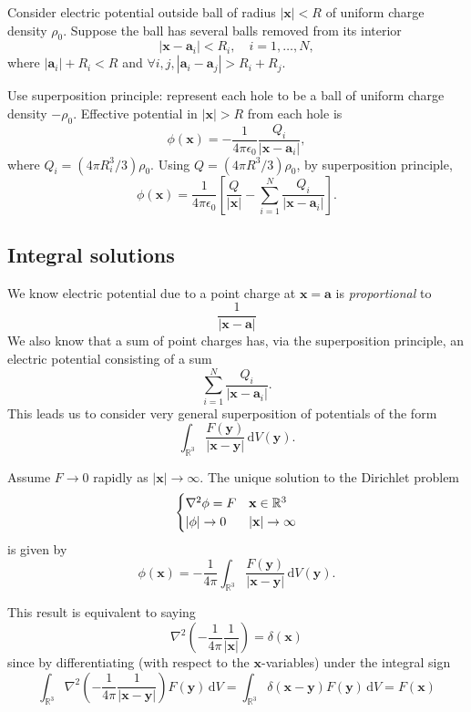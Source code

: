 \begin{example}
    Consider electric potential outside ball of radius $ |\mathbf{x}|<R $ of uniform charge density $ \rho_0 $. Suppose the ball has several balls removed from its interior
    \[
        |\mathbf{x}-\mathbf{a}_i|<R_i,\quad i=1,\dots,N,
    \]
    where $ |\mathbf{a}_i|+R_i<R $ and $ \forall i,j, |\mathbf{a}_i-\mathbf{a}_j|>R_i+R_j $.

    Use superposition principle: represent each hole to be a ball of uniform charge density $ -\rho_0 $. Effective potential in $ |\mathbf{x}|>R $ from each hole is 
    \[
        \phi(\mathbf{x}) = -\frac{1}{4\pi \epsilon_0}\frac{Q_i}{|\mathbf{x}-\mathbf{a}_i|},
    \]
    where $Q_{i}=\left(4 \pi R_{i}^{3} / 3\right) \rho_{0}$. Using $ Q=\left(4 \pi R^{3} / 3\right) \rho_{0} $, by superposition principle, 
    \[
        \phi(\mathbf{x})=\frac{1}{4 \pi \epsilon_{0}}\left[\frac{Q}{|\mathbf{x}|}-\sum_{i=1}^{N} \frac{Q_{i}}{\left|\mathbf{x}-\mathbf{a}_{i}\right|}\right].
    \]
\end{example}

\subsection{Integral solutions}
We know electric potential due to a point charge at $ \mathbf{x}=\mathbf{a} $ is \textit{proportional} to 
\[
    \frac{1}{|\mathbf{x}-\mathbf{a}|}
\]
We also know that a sum of point charges has, via the superposition principle, an electric potential consisting of a sum
\[
    \sum_{i=1}^{N}\frac{Q_i}{|\mathbf{x}-\mathbf{a}_i|}.
\]
This leads us to consider very general superposition of potentials of the form
\[
    \int_{\mathbb{R}^3} \frac{F(\mathbf{y})}{|\mathbf{x}-\mathbf{y}|} \,\mathrm{d}V(\mathbf{y}).
\]
\begin{proposition}
    Assume $F\to 0$ rapidly as $ |\mathbf{x}|\to \infty $. The unique solution to the Dirichlet problem
    \[
        \begin{cases}
        \laplacian\phi=F &\mathbf{x}\in\mathbb{R}^3\\
        |\phi|\to 0 &|\mathbf{x}|\to \infty\\
        \end{cases} 
    \]
    is given by 
    \[
        \phi(\mathbf{x}) = -\frac{1}{4\pi}\int_{\mathbb{R}^3} \frac{F(\mathbf{y})}{|\mathbf{x}-\mathbf{y}|} \,\mathrm{d}V(\mathbf{y}).
    \]
\end{proposition}

This result is equivalent to saying
\[
    \nabla^{2}\left(-\frac{1}{4 \pi} \frac{1}{|\mathbf{x}|}\right)=\delta(\mathbf{x})
\]
since by differentiating (with respect to the $\mathbf{x}$-variables) under the integral sign
\[
    \int_{\mathbb{R}^{3}} \nabla^{2}\left(-\frac{1}{4 \pi} \frac{1}{|\mathbf{x}-\mathbf{y}|}\right) F(\mathbf{y}) \,\mathrm{d} V=\int_{\mathbb{R}^{3}} \delta(\mathbf{x}-\mathbf{y}) F(\mathbf{y}) \,\mathrm{d} V=F(\mathbf{x})
\]

